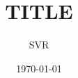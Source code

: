 \documentclass[10pt]{article}
\title{TITLE}
\author{SVR}
\date{\today}
\begin{document}

\maketitle


\lipsum



\end{document}
